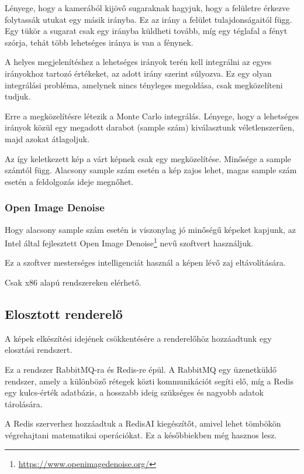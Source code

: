 Lényege, hogy a kamerából kijövő sugaraknak hagyjuk, hogy a felületre érkezve folytassák utukat egy másik irányba. Ez az irány a felület tulajdonságaitól függ. Egy tükör a sugarat csak egy irányba küldheti tovább, míg egy téglafal a fényt szórja, tehát több lehetséges iránya is van a fénynek. 

A helyes megjelenítéshez a lehetséges irányok terén kell integrálni az egyes irányokhoz tartozó értékeket, az adott irány szerint súlyozva. Ez egy olyan integrálási probléma, amelynek nincs tényleges megoldása, csak megközelíteni tudjuk.

Erre a megközelítésre létezik a Monte Carlo integrálás. Lényege, hogy a lehetséges irányok közül egy megadott darabot (sample szám) kiválasztunk véletlenszerűen, majd azokat átlagoljuk.

Az így keletkezett kép a várt képnek csak egy megközelítése. Minősége a sample számtól függ. Alacsony sample szám esetén a kép zajos lehet, magas sample szám esetén a feldolgozás ideje megnőhet.

\subsubsection{Open Image Denoise}
Hogy alacsony sample szám esetén is viszonylag jó minőségű képeket kapjunk, az Intel által fejlesztett Open Image Denoise\footnote{\url{https://www.openimagedenoise.org/}} nevű szoftvert használjuk. 

Ez a szoftver mesterséges intelligenciát használ a képen lévő zaj eltávolítására.

Csak x86 alapú rendszereken elérhető.


\subsection{Elosztott renderelő}

A képek elkészítési idejének csökkentésére a renderelőhöz hozzáadtunk egy elosztási rendszert.

Ez a rendszer RabbitMQ-ra és Redis-re épül. A RabbitMQ egy üzenetküldő rendszer, amely a különböző rétegek közti kommunikációt segíti elő, míg a Redis egy kulcs-érték adatbázis, a hosszabb ideig szükséges és nagyobb adatok tárolására.

A Redis szerverhez hozzáadtuk a RedisAI kiegészítőt, amivel lehet tömbökön végrehajtani matematikai operációkat. Ez a későbbiekben még hasznos lesz.

